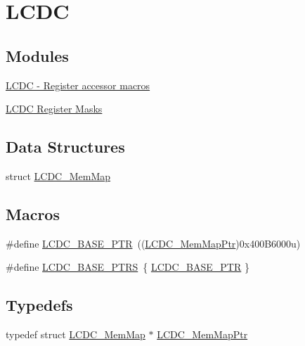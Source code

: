 \hypertarget{group___l_c_d_c___peripheral}{}\section{L\+C\+D\+C}
\label{group___l_c_d_c___peripheral}
\subsection*{Modules}
\begin{DoxyCompactItemize}
\item 
\hyperlink{group___l_c_d_c___register___accessor___macros}{L\+C\+D\+C -\/ Register accessor macros}
\item 
\hyperlink{group___l_c_d_c___register___masks}{L\+C\+D\+C Register Masks}
\end{DoxyCompactItemize}
\subsection*{Data Structures}
\begin{DoxyCompactItemize}
\item 
struct \hyperlink{struct_l_c_d_c___mem_map}{L\+C\+D\+C\+\_\+\+Mem\+Map}
\end{DoxyCompactItemize}
\subsection*{Macros}
\begin{DoxyCompactItemize}
\item 
\#define \hyperlink{group___l_c_d_c___peripheral_ga87dd9b3292c2c039290038a24dda01c4}{L\+C\+D\+C\+\_\+\+B\+A\+S\+E\+\_\+\+P\+T\+R}~((\hyperlink{group___l_c_d_c___peripheral_ga1c8cfa0904993c6824ce5630db14b104}{L\+C\+D\+C\+\_\+\+Mem\+Map\+Ptr})0x400\+B6000u)
\item 
\#define \hyperlink{group___l_c_d_c___peripheral_ga82f1fb1d895768e620108f8fd5ab276a}{L\+C\+D\+C\+\_\+\+B\+A\+S\+E\+\_\+\+P\+T\+R\+S}~\{ \hyperlink{group___l_c_d_c___peripheral_ga87dd9b3292c2c039290038a24dda01c4}{L\+C\+D\+C\+\_\+\+B\+A\+S\+E\+\_\+\+P\+T\+R} \}
\end{DoxyCompactItemize}
\subsection*{Typedefs}
\begin{DoxyCompactItemize}
\item 
typedef struct \hyperlink{struct_l_c_d_c___mem_map}{L\+C\+D\+C\+\_\+\+Mem\+Map} $\ast$ \hyperlink{group___l_c_d_c___peripheral_ga1c8cfa0904993c6824ce5630db14b104}{L\+C\+D\+C\+\_\+\+Mem\+Map\+Ptr}
\end{DoxyCompactItemize}


